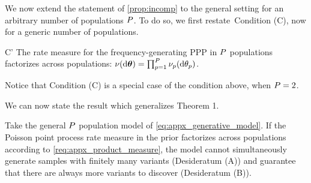 We now extend the statement of \cref{prop:incomp} to the general setting for an arbitrary number of populations $P$. 
To do so, we first restate~Condition (C), now for a generic number of populations.
\begin{conditionp}{C'} \label{req:appx_product_measure}
	The rate measure for the frequency-generating PPP in $P$ populations factorizes across populations:
	$\nu(\mathrm{d}\boldsymbol{\theta}) = \prod_{p=1}^{P} \nu_{p}(\mathrm{d}\theta_{p})$.  
\end{conditionp}
Notice that Condition (C) is a special case of the condition above, when $P = 2$.

We can now state the result which generalizes Theorem 1.

\begin{myTheorem} \label{prop:incomp_general}
	Take the general $P$ population model of \cref{eq:appx_generative_model}. If the Poisson point process
	rate measure in the prior factorizes across populations according to \cref{req:appx_product_measure},
	the model cannot simultaneously generate samples with finitely many variants (Desideratum (A))
	and guarantee that there are always more variants to discover (Desideratum (B)).
\end{myTheorem}

